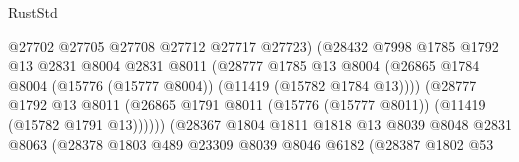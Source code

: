 \begin{lexlean}{RustStd}
\begin{coremodule}
                                          @27702
                                          @27705
                                          @27708
                                          @27712
                                          @27717
                                          @27723)
                                        (@28432
                                          @7998
                                          @1785
                                          @1792
                                          @13
                                          @2831
                                          @8004
                                          @2831
                                          @8011
                                          (@28777
                                            @1785
                                            @13
                                            @8004
                                            (@26865
                                              @1784
                                              @8004
                                              (@15776 (@15777 @8004))
                                              (@11419 (@15782 @1784 @13))))
                                          (@28777
                                            @1792
                                            @13
                                            @8011
                                            (@26865
                                              @1791
                                              @8011
                                              (@15776 (@15777 @8011))
                                              (@11419 (@15782 @1791 @13))))))
                                      (@28367
                                        @1804
                                        @1811
                                        @1818
                                        @13
                                        @8039
                                        @8048
                                        @2831
                                        @8063
                                        (@28378
                                          @1803
                                          @489
                                          @23309
                                          @8039
                                          @8046
                                          @6182
                                          (@28387
                                            @1802
                                            @53

\end{coremodule}
\end{lexlean}
